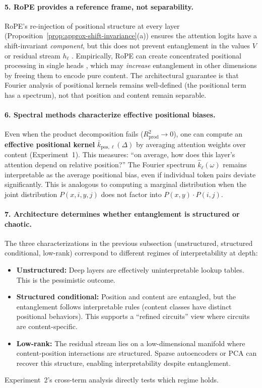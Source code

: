\documentclass[11pt]{article}
\theoremstyle{definition}
\begin{document}
\paragraph{5. RoPE provides a reference frame, not separability.}
RoPE's re-injection of positional structure at every layer (Proposition~\ref{prop:approx-shift-invariance}(a)) ensures the attention logits have a shift-invariant \emph{component}, but this does not prevent entanglement in the values $V$ or residual stream $h_\ell$ \cite{su2021roformer}. Empirically, RoPE can create concentrated positional processing in single heads \cite{unpacking2025spectral}, which may \emph{increase} entanglement in other dimensions by freeing them to encode pure content. The architectural guarantee is that Fourier analysis of positional kernels remains well-defined (the positional term has a spectrum), not that position and content remain separable.

\paragraph{6. Spectral methods characterize effective positional biases.}
Even when the product decomposition fails ($R^2_{\text{prod}} \to 0$), one can compute an \textbf{effective positional kernel} $\bar{k}_{\text{pos},\ell}(\Delta)$ by averaging attention weights over content (Experiment~1). This measures: ``on average, how does this layer's attention depend on relative position?'' The Fourier spectrum $\hat{k}_\ell(\omega)$ remains interpretable as the average positional bias, even if individual token pairs deviate significantly. This is analogous to computing a marginal distribution when the joint distribution $P(x,i,y,j)$ does not factor into $P(x,y) \cdot P(i,j)$.

\paragraph{7. Architecture determines whether entanglement is structured or chaotic.}
The three characterizations in the previous subsection (unstructured, structured conditional, low-rank) correspond to different regimes of interpretability at depth:
\begin{itemize}
    \item \textbf{Unstructured:} Deep layers are effectively uninterpretable lookup tables. This is the pessimistic outcome.
    \item \textbf{Structured conditional:} Position and content are entangled, but the entanglement follows interpretable rules (content classes have distinct positional behaviors). This supports a ``refined circuits'' view where circuits are content-specific.
    \item \textbf{Low-rank:} The residual stream lies on a low-dimensional manifold where content-position interactions are structured. Sparse autoencoders \cite{bricken2023monosemanticity,templeton2024sae} or PCA can recover this structure, enabling interpretability despite entanglement.
\end{itemize}
Experiment~2's cross-term analysis directly tests which regime holds.
\end{document}
